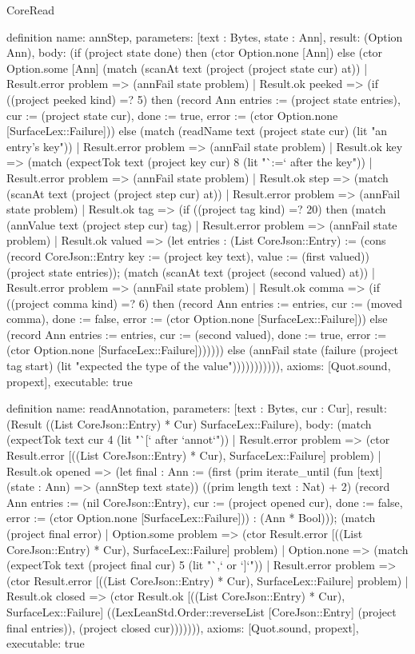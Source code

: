 \begin{lexlean}{CoreRead}
\begin{semanticmodule}
definition{
  name: annStep,
  parameters: [text : Bytes, state : Ann],
  result: (Option Ann),
  body: (if (project state done) then (ctor Option.none [Ann]) else (ctor Option.some [Ann] (match (scanAt text (project (project state cur) at))
    | Result.error problem => (annFail state problem)
    | Result.ok peeked => (if ((project peeked kind) =? 5) then (record Ann {entries := (project state entries), cur := (project state cur), done := true, error := (ctor Option.none [SurfaceLex::Failure])}) else (match (readName text (project state cur) (lit "an entry's key"))
      | Result.error problem => (annFail state problem)
      | Result.ok key => (match (expectTok text (project key cur) 8 (lit "`:=` after the key"))
        | Result.error problem => (annFail state problem)
        | Result.ok step => (match (scanAt text (project (project step cur) at))
          | Result.error problem => (annFail state problem)
          | Result.ok tag => (if ((project tag kind) =? 20) then (match (annValue text (project step cur) tag)
            | Result.error problem => (annFail state problem)
            | Result.ok valued => (let entries : (List CoreJson::Entry) := (cons (record CoreJson::Entry {key := (project key text), value := (first valued)}) (project state entries)); (match (scanAt text (project (second valued) at))
              | Result.error problem => (annFail state problem)
              | Result.ok comma => (if ((project comma kind) =? 6) then (record Ann {entries := entries, cur := (moved comma), done := false, error := (ctor Option.none [SurfaceLex::Failure])}) else (record Ann {entries := entries, cur := (second valued), done := true, error := (ctor Option.none [SurfaceLex::Failure])}))))) else (annFail state (failure (project tag start) (lit "expected the type of the value"))))))))))),
  axioms: [Quot.sound, propext],
  executable: true
}

definition{
  name: readAnnotation,
  parameters: [text : Bytes, cur : Cur],
  result: (Result ((List CoreJson::Entry) * Cur) SurfaceLex::Failure),
  body: (match (expectTok text cur 4 (lit "`[` after `annot`"))
    | Result.error problem => (ctor Result.error [((List CoreJson::Entry) * Cur), SurfaceLex::Failure] problem)
    | Result.ok opened => (let final : Ann := (first (prim iterate_until (fun [text] (state : Ann) => (annStep text state)) ((prim length text : Nat) + 2) (record Ann {entries := (nil CoreJson::Entry), cur := (project opened cur), done := false, error := (ctor Option.none [SurfaceLex::Failure])}) : (Ann * Bool))); (match (project final error)
      | Option.some problem => (ctor Result.error [((List CoreJson::Entry) * Cur), SurfaceLex::Failure] problem)
      | Option.none => (match (expectTok text (project final cur) 5 (lit "`,` or `]`"))
        | Result.error problem => (ctor Result.error [((List CoreJson::Entry) * Cur), SurfaceLex::Failure] problem)
        | Result.ok closed => (ctor Result.ok [((List CoreJson::Entry) * Cur), SurfaceLex::Failure] ((LexLeanStd.Order::reverseList [CoreJson::Entry] (project final entries)), (project closed cur))))))),
  axioms: [Quot.sound, propext],
  executable: true
}


\end{semanticmodule}
\end{lexlean}
